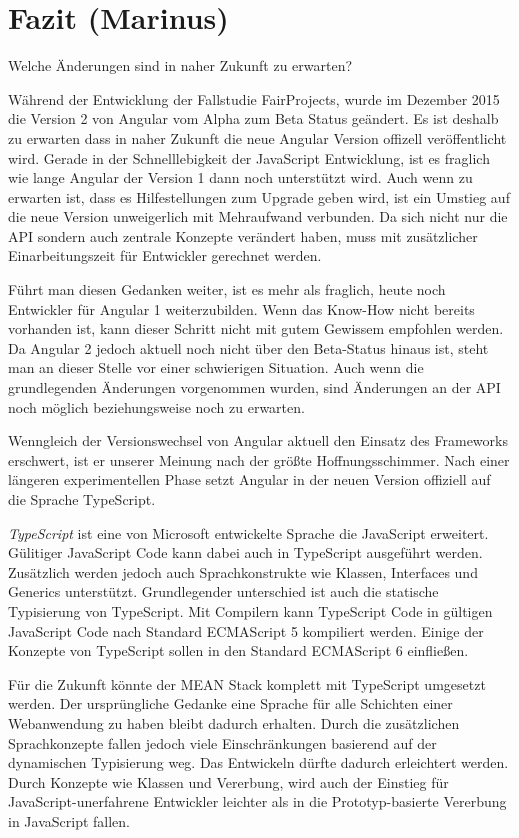 \chapter{Fazit (Marinus)}
\label{fazit}
Welche Änderungen sind in naher Zukunft zu erwarten?

Während der Entwicklung der Fallstudie FairProjects, wurde im Dezember
2015 die Version 2 von Angular vom Alpha zum Beta Status geändert. Es
ist deshalb zu erwarten dass in naher Zukunft die neue Angular Version
offizell veröffentlicht wird. Gerade in der Schnelllebigkeit der
JavaScript Entwicklung, ist es fraglich wie lange Angular der Version 1
dann noch unterstützt wird. Auch wenn zu erwarten ist, dass es
Hilfestellungen zum Upgrade geben wird, ist ein Umstieg auf die neue
Version unweigerlich mit Mehraufwand verbunden. Da sich nicht nur die
API sondern auch zentrale Konzepte verändert haben, muss mit
zusätzlicher Einarbeitungszeit für Entwickler gerechnet werden.

Führt man diesen Gedanken weiter, ist es mehr als fraglich, heute noch
Entwickler für Angular 1 weiterzubilden. Wenn das Know-How nicht bereits
vorhanden ist, kann dieser Schritt nicht mit gutem Gewissem empfohlen
werden. Da Angular 2 jedoch aktuell noch nicht über den Beta-Status
hinaus ist, steht man an dieser Stelle vor einer schwierigen Situation.
Auch wenn die grundlegenden Änderungen vorgenommen wurden, sind
Änderungen an der API noch möglich beziehungsweise noch zu erwarten.

Wenngleich der Versionswechsel von Angular aktuell den Einsatz des
Frameworks erschwert, ist er unserer Meinung nach der größte
Hoffnungsschimmer. Nach einer längeren experimentellen Phase setzt
Angular in der neuen Version offiziell auf die Sprache TypeScript.

\emph{TypeScript} ist eine von Microsoft entwickelte Sprache die
JavaScript erweitert. Gülitiger JavaScript Code kann dabei auch in
TypeScript ausgeführt werden. Zusätzlich werden jedoch auch
Sprachkonstrukte wie Klassen, Interfaces und Generics unterstützt.
Grundlegender unterschied ist auch die statische Typisierung von
TypeScript. Mit Compilern kann TypeScript Code in gültigen JavaScript
Code nach Standard ECMAScript 5 kompiliert werden. Einige der Konzepte
von TypeScript sollen in den Standard ECMAScript 6 einfließen.

Für die Zukunft könnte der MEAN Stack komplett mit TypeScript umgesetzt
werden. Der ursprüngliche Gedanke eine Sprache für alle Schichten einer
Webanwendung zu haben bleibt dadurch erhalten. Durch die zusätzlichen
Sprachkonzepte fallen jedoch viele Einschränkungen basierend auf der
dynamischen Typisierung weg. Das Entwickeln dürfte dadurch erleichtert
werden. Durch Konzepte wie Klassen und Vererbung, wird auch der Einstieg
für JavaScript-unerfahrene Entwickler leichter als in die
Prototyp-basierte Vererbung in JavaScript fallen.